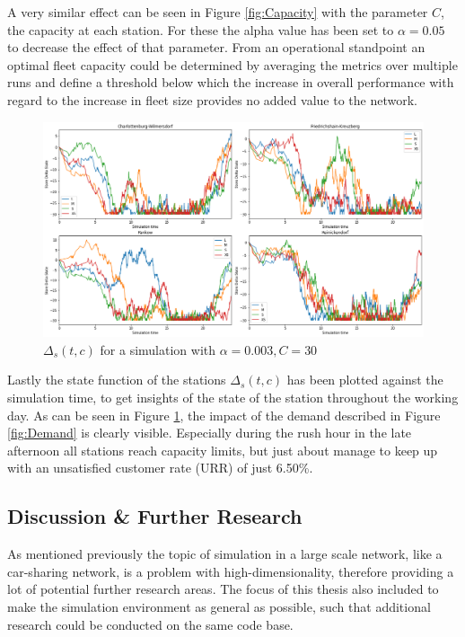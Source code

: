 A very similar effect can be seen in Figure \ref{fig:Capacity} with the parameter $C$,
the capacity at each station. For these the alpha value has been set to $\alpha = 0.05$ 
to decrease the effect of that parameter. From an operational standpoint an optimal
fleet capacity could be determined by averaging the metrics over multiple runs
and define a threshold below which the increase in overall performance with regard to the
increase in fleet size provides no added value to the network.

\begin{figure}[htbp]
  \centering
  \includegraphics[width=\linewidth]{./Figures/delta-func.png}
  \caption{$\Delta_s(t, c)$ for a simulation with $\alpha=0.003, C=30$}
  \label{fig:DeltaFunc}
\end{figure}

Lastly the state function of the stations $\Delta_s(t, c)$ has been plotted against the
simulation time, to get insights of the state of the station throughout the working day.
As can be seen in Figure \ref{fig:DeltaFunc}, the impact of the demand described in Figure \ref{fig:Demand}
is clearly visible. Especially during the rush hour in the late afternoon all stations
reach capacity limits, but just about manage to keep up with an unsatisfied customer rate (URR)
of just 6.50\%. 

\subsection{Discussion \& Further Research}
\label{sub_sec:Results/Discussion}

As mentioned previously the topic of simulation in a large scale network, like a car-sharing network,
is a problem with high-dimensionality, therefore providing a lot of potential further research areas.
The focus of this thesis also included to make the simulation environment as general 
as possible, such that additional research could be conducted on the same code base.

